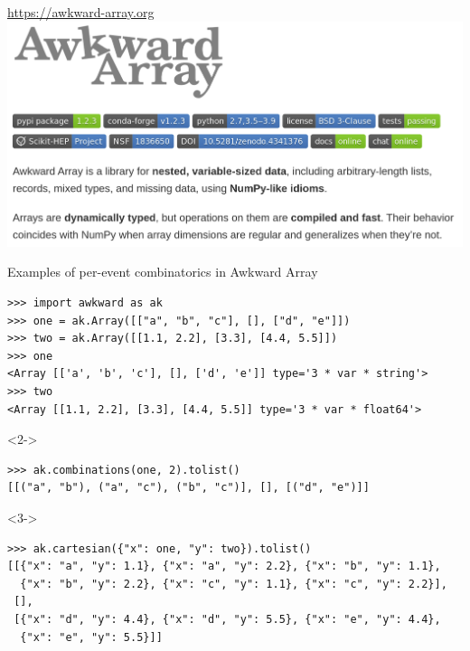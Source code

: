 \documentclass[aspectratio=169]{beamer}
\begin{document}
\begin{frame}{\href{https://awkward-array.org}{https://awkward-array.org}}
\vspace{0.5 cm}
\includegraphics[width=\linewidth]{awkward-array-org.png}
\end{frame}

\begin{frame}[fragile]{Examples of per-event combinatorics in Awkward Array}
\vspace{0.2 cm}
\small
\begin{verbatim}
>>> import awkward as ak
>>> one = ak.Array([["a", "b", "c"], [], ["d", "e"]])
>>> two = ak.Array([[1.1, 2.2], [3.3], [4.4, 5.5]])
>>> one
<Array [['a', 'b', 'c'], [], ['d', 'e']] type='3 * var * string'>
>>> two
<Array [[1.1, 2.2], [3.3], [4.4, 5.5]] type='3 * var * float64'>
\end{verbatim}
\vspace{0.2 cm}
\begin{uncoverenv}<2->
\begin{verbatim}
>>> ak.combinations(one, 2).tolist()
[[("a", "b"), ("a", "c"), ("b", "c")], [], [("d", "e")]]
\end{verbatim}
\end{uncoverenv}
\vspace{0.2 cm}
\begin{uncoverenv}<3->
\begin{verbatim}
>>> ak.cartesian({"x": one, "y": two}).tolist()
[[{"x": "a", "y": 1.1}, {"x": "a", "y": 2.2}, {"x": "b", "y": 1.1},
  {"x": "b", "y": 2.2}, {"x": "c", "y": 1.1}, {"x": "c", "y": 2.2}],
 [],
 [{"x": "d", "y": 4.4}, {"x": "d", "y": 5.5}, {"x": "e", "y": 4.4},
  {"x": "e", "y": 5.5}]]
\end{verbatim}
\end{uncoverenv}
\end{frame}
\end{document}
